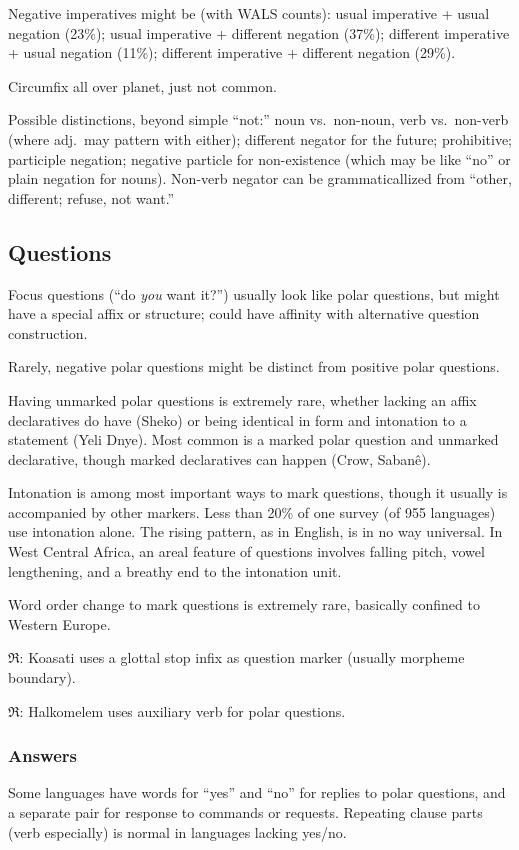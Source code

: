 \documentclass[11pt]{article}
\newcommand{\rara}[1]{$\mathfrak{R}$: #1}
\begin{document}
Negative imperatives might be (with WALS counts): usual imperative +
usual negation (23\%); usual imperative + different negation (37\%);
different imperative + usual negation (11\%); different imperative +
different negation (29\%).

Circumfix all over planet, just not common.

Possible distinctions, beyond simple ``not:'' noun vs.\ non-noun, verb
vs.\ non-verb (where adj.\ may pattern with either); different negator
for the future; prohibitive; participle negation; negative particle
for non-existence (which may be like ``no'' or plain negation for
nouns).  Non-verb negator can be grammaticallized from ``other,
different; refuse, not want.''

\subsection{Questions}
Focus questions (``do \textit{you} want it?'') usually look like polar
questions, but might have a special affix or structure; could have
affinity with alternative question construction.

Rarely, negative polar questions might be distinct from positive polar
questions. 

Having unmarked polar questions is extremely rare, whether lacking an
affix declaratives do have (Sheko) or being identical in form and
intonation to a statement (Yeli Dnye).  Most common is a marked polar
question and unmarked declarative, though marked declaratives can
happen (Crow, Sabanê).

Intonation is among most important ways to mark questions, though it
usually is accompanied by other markers.  Less than 20\% of one survey
(of 955 languages) use intonation alone.  The rising pattern, as in
English, is in no way universal.  In West Central Africa, an areal
feature of questions involves falling pitch, vowel lengthening, and a
breathy end to the intonation unit.

Word order change to mark questions is extremely rare, basically
confined to Western Europe.

\rara{Koasati uses a glottal stop infix as question marker (usually
morpheme boundary).}

\rara{Halkomelem uses auxiliary verb for polar questions.}

\subsubsection{Answers}
Some languages have words for ``yes'' and ``no'' for replies to polar
questions, and a separate pair for response to commands or requests.
Repeating clause parts (verb especially) is normal in languages
lacking yes/no.
\end{document}
